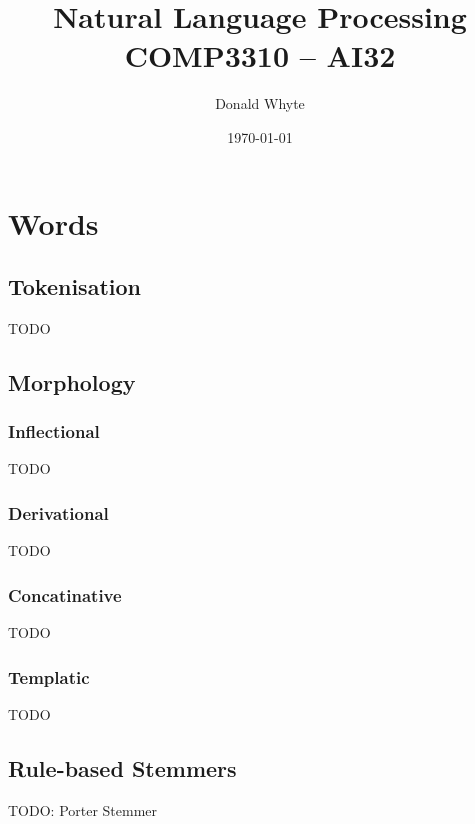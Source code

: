 \documentclass{article}
\title{Natural Language Processing \\ COMP3310 -- AI32}
\author{Donald Whyte}
\date{\today}
\begin{document}
\maketitle

\tableofcontents

\pagebreak
\listoffigures

\pagebreak
\listoftables

\pagebreak

\section{Words}

\subsection{Tokenisation}

TODO

\subsection{Morphology}

\subsubsection{Inflectional}

TODO

\subsubsection{Derivational}

TODO

\subsubsection{Concatinative}

TODO

\subsubsection{Templatic}

TODO

\subsection{Rule-based Stemmers}

TODO: Porter Stemmer
\end{document}
